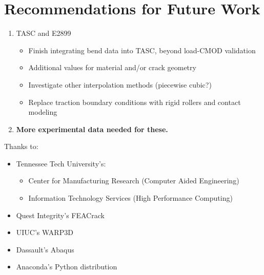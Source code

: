 \section{Recommendations for Future Work}

\begin{frame}
\begin{enumerate}
\item TASC and E2899
\begin{itemize}
\item Finish integrating bend data into TASC, beyond load-CMOD validation
\item Additional values for material and/or crack geometry
\item Investigate other interpolation methods (piecewise cubic?)
\item Replace traction boundary conditions with rigid rollers and contact modeling
\end{itemize}
\item {\bfseries More experimental data needed for these.}
\end{enumerate}
\note{
\vfill
}
\end{frame}

\begin{frame}[plain]
\vfill
Thanks to:
\begin{itemize}
\item Tennessee Tech University's:
\begin{itemize}
\item Center for Manufacturing Research (Computer Aided Engineering)
\item Information Technology Services (High Performance Computing)
\end{itemize}
\item Quest Integrity's FEACrack
\item UIUC's WARP3D
\item Dassault's Abaqus
\item Anaconda's Python distribution
\end{itemize}
\vfill
\note{
\vfill
}
\end{frame}

